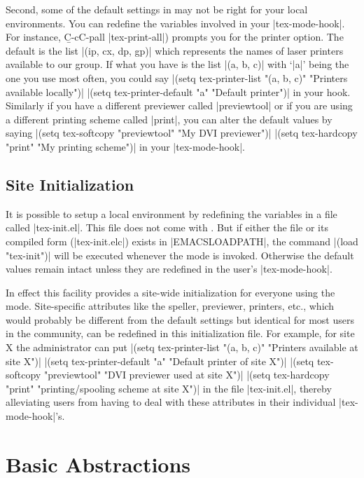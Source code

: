 Second, some of the default settings in {\TM} may not
be right for your local environments.  You can redefine the variables involved
in your |tex-mode-hook|.  For instance, {\b C-c{\s}C-p{\s}all} 
|tex-print-all|) prompts you for the printer option.
The default is the list |(ip, cx, dp, gp)| which represents the names of laser
printers available to our group.
If what you have is the list |(a, b, c)| with `|a|' being the one you use most 
often, you could say
\begindisplay
|(setq tex-printer-list "(a, b, c)" "Printers available locally")|\cr
|(setq tex-printer-default "a" "Default printer")|\cr
\enddisplay
in your hook.  Similarly if you have a different previewer called |previewtool|
or if you are using a different printing scheme called |print|, you can alter
the default values by saying
\begindisplay
|(setq tex-softcopy "previewtool" "My DVI previewer")|\cr
|(setq tex-hardcopy "print" "My printing scheme")|\cr
\enddisplay
in your |tex-mode-hook|.

\section{Site Initialization}
\noindent
It is possible to setup a local {\TM} environment by redefining
the variables in a file called |tex-init.el|.  
This file does not come with
{\TM}.  But if either the file or its compiled form (|tex-init.elc|)
exists in |EMACSLOADPATH|, the command
\begindisplay
|(load "tex-init")|\cr
\enddisplay
will be executed whenever the mode is invoked.  Otherwise the default
values remain intact unless they are redefined in the user's |tex-mode-hook|.

In effect this facility provides a site-wide initialization for everyone
using the mode.  Site-specific attributes like
the speller, previewer, printers, etc., which would probably be
different from the default settings but identical for most users in
the community, can be redefined in this initialization
file.  For example, for site X the {\TM} administrator can put
\begindisplay
|(setq tex-printer-list "(a, b, c)" "Printers available at site X")|\cr
|(setq tex-printer-default "a" "Default printer of site X")|\cr
|(setq tex-softcopy "previewtool" "DVI previewer used at site X")|\cr
|(setq tex-hardcopy "print" "printing/spooling scheme at site X")|\cr
\enddisplay
in the file |tex-init.el|, thereby alleviating users from having to deal
with these attributes in their individual |tex-mode-hook|'s.



\chapter{Basic Abstractions}

